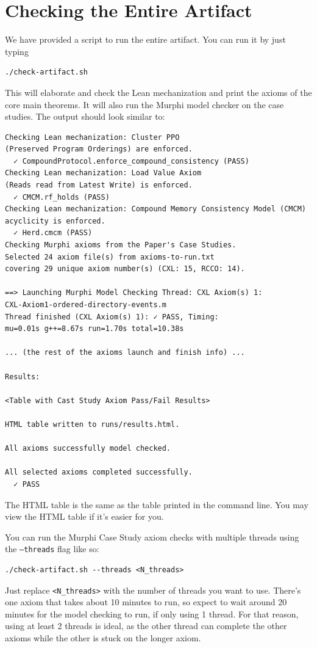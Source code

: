 \section{Checking the Entire Artifact}
We have provided a script to run the entire artifact.
You can run it by just typing 
\begin{verbatim}
./check-artifact.sh
\end{verbatim}
This will elaborate and check the Lean mechanization and print the axioms of the core main theorems.
It will also run the Murphi model checker on the case studies.
The output should look similar to:
\begin{verbatim}
Checking Lean mechanization: Cluster PPO
(Preserved Program Orderings) are enforced.
  ✓ CompoundProtocol.enforce_compound_consistency (PASS)
Checking Lean mechanization: Load Value Axiom
(Reads read from Latest Write) is enforced.
  ✓ CMCM.rf_holds (PASS)
Checking Lean mechanization: Compound Memory Consistency Model (CMCM)
acyclicity is enforced.
  ✓ Herd.cmcm (PASS)
Checking Murphi axioms from the Paper's Case Studies.
Selected 24 axiom file(s) from axioms-to-run.txt
covering 29 unique axiom number(s) (CXL: 15, RCCO: 14).

==> Launching Murphi Model Checking Thread: CXL Axiom(s) 1:
CXL-Axiom1-ordered-directory-events.m
Thread finished (CXL Axiom(s) 1): ✓ PASS, Timing:
mu=0.01s g++=8.67s run=1.70s total=10.38s

... (the rest of the axioms launch and finish info) ...

Results:

<Table with Cast Study Axiom Pass/Fail Results>

HTML table written to runs/results.html.

All axioms successfully model checked.

All selected axioms completed successfully.
  ✓ PASS
\end{verbatim}
The HTML table is the same as the table printed in the command line.
You may view the HTML table if it's easier for you.

You can run the Murphi Case Study axiom checks with multiple threads using the
\texttt{--threads} flag like so:
\begin{verbatim}
./check-artifact.sh --threads <N_threads>
\end{verbatim}
Just replace \texttt{<N\_threads>} with the number of threads you want to use.
There's one axiom that takes about 10 minutes to run, so expect to wait around 20
minutes for the model checking to run, if only using 1 thread.
For that reason, using at least 2 threads is ideal, as the other thread can complete
the other axioms while the other is stuck on the longer axiom.

